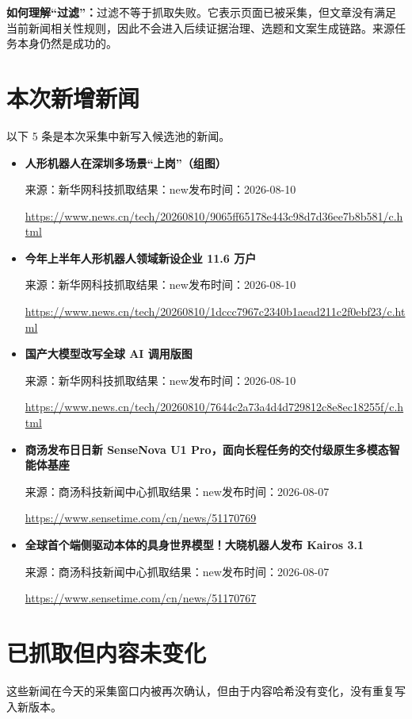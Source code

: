 \documentclass[UTF8,11pt,a4paper,fontset=none]{ctexart}
\newcommand{\newsitem}[5]{%
  \item \textbf{#1}\par
  {\small\textcolor{slate}{来源：#2\quad 抓取结果：#3\quad 发布时间：#4}}\par
  {\footnotesize\url{#5}}
}
\begin{document}
\begin{boundarybox}
\textbf{如何理解“过滤”：}过滤不等于抓取失败。它表示页面已被采集，但文章没有满足当前新闻相关性规则，因此不会进入后续证据治理、选题和文案生成链路。来源任务本身仍然是成功的。
\end{boundarybox}

\section{本次新增新闻}

以下 5 条是本次采集中新写入候选池的新闻。

\begin{itemize}[leftmargin=1.6em,itemsep=0.8em,topsep=0.3em]
\newsitem{人形机器人在深圳多场景“上岗”（组图）}{新华网科技}{new}{2026-08-10}{https://www.news.cn/tech/20260810/9065ff65178e443c98d7d36ee7b8b581/c.html}
\newsitem{今年上半年人形机器人领域新设企业 11.6 万户}{新华网科技}{new}{2026-08-10}{https://www.news.cn/tech/20260810/1dccc7967c2340b1aead211c2f0ebf23/c.html}
\newsitem{国产大模型改写全球 AI 调用版图}{新华网科技}{new}{2026-08-10}{https://www.news.cn/tech/20260810/7644c2a73a4d4d729812c8e8ec18255f/c.html}
\newsitem{商汤发布日日新 SenseNova U1 Pro，面向长程任务的交付级原生多模态智能体基座}{商汤科技新闻中心}{new}{2026-08-07}{https://www.sensetime.com/cn/news/51170769}
\newsitem{全球首个端侧驱动本体的具身世界模型！大晓机器人发布 Kairos 3.1}{商汤科技新闻中心}{new}{2026-08-07}{https://www.sensetime.com/cn/news/51170767}
\end{itemize}

\section{已抓取但内容未变化}

这些新闻在今天的采集窗口内被再次确认，但由于内容哈希没有变化，没有重复写入新版本。
\end{document}
